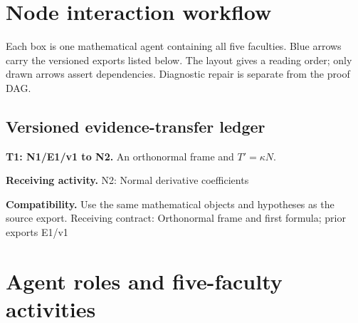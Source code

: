 \documentclass[preprint,12pt,aps,pra,showkeys,amsmath,amssymb,superscriptaddress,floatfix]{revtex4-2}
\theoremstyle{definition}
\theoremstyle{remark}
\newcommand{\field}[2]{\par\smallskip\noindent\textbf{#1.} #2\par}
\begin{document}
\clearpage\section{Node interaction workflow}

\begin{center}\end{center}

Each box is one mathematical agent containing all five faculties. Blue
arrows carry the versioned exports listed below. The layout gives a
reading order; only drawn arrows assert dependencies. Diagnostic repair
is separate from the proof DAG.

\subsection{Versioned evidence-transfer ledger}

\begingroup\small\linespread{1.05}\selectfont

\field{T1: N1/E1/v1 to N2}{An orthonormal frame and \(T'=\kappa N\).}

\field{Receiving activity}{N2: Normal derivative coefficients}

\field{Compatibility}{Use the same mathematical objects and hypotheses as the source export.
Receiving contract: Orthonormal frame and first formula; prior exports
E1/v1}

\endgroup

\clearpage\section{Agent roles and five-faculty activities}\begingroup\small\linespread{1.05}\selectfont{}
\end{document}
